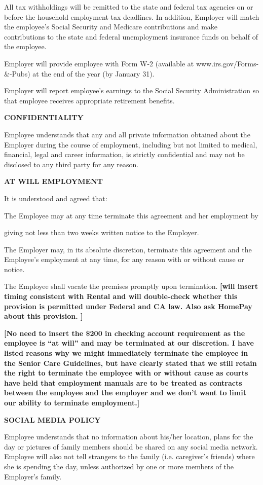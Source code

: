 \documentclass[]{article}
\begin{document}
All tax withholdings will be remitted to the state and federal tax
agencies on or before the household employment tax deadlines. In
addition, Employer will match the employee's Social Security and
Medicare contributions and make contributions to the state and federal
unemployment insurance funds on behalf of the employee.

Employer will provide employee with Form W-2 (available at
www.irs.gov/Forms-\&-Pubs) at the end of the year (by January 31).

Employer will report employee's earnings to the Social Security
Administration so that employee receives appropriate retirement
benefits.

\textbf{CONFIDENTIALITY}

Employee understands that any and all private information obtained about
the Employer during the course of employment, including but not limited
to medical, financial, legal and career information, is strictly
confidential and may not be disclosed to any third party for any reason.

\textbf{AT WILL EMPLOYMENT}

It is understood and agreed that:

The Employee may at any time terminate this agreement and her employment
by

giving not less than two weeks written notice to the Employer.

The Employer may, in its absolute discretion, terminate this agreement
and the Employee's employment at any time, for any reason with or
without cause or notice.

The Employee shall vacate the premises promptly upon termination.
\textbf{{[}will insert timing consistent with Rental and will
double-check whether this provision is permitted under Federal and CA
law. Also ask HomePay about this provision. {]}}

\textbf{{[}No need to insert the \$200 in checking account requirement
as the employee is ``at will'' and may be terminated at our discretion.
I have listed reasons why we might immediately terminate the employee in
the Senior Care Guidelines, but have clearly stated that we still retain
the right to terminate the employee with or without cause as courts have
held that employment manuals are to be treated as contracts between the
employee and the employer and we don't want to limit our ability to
terminate employment.{]} }

\textbf{SOCIAL MEDIA POLICY}

Employee understands that no information about his/her location, plans
for the day or pictures of family members should be shared on any social
media network. Employee will also not tell strangers to the family (i.e.
caregiver's friends) where she is spending the day, unless authorized by
one or more members of the Employer's family.
\end{document}
